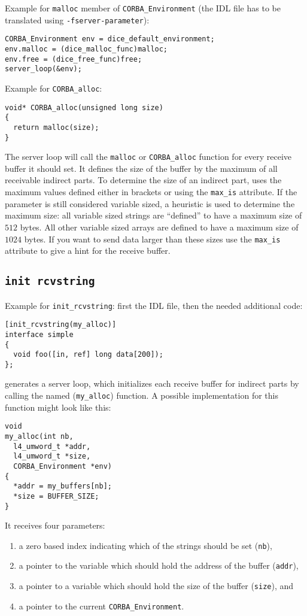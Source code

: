 Example for \verb|malloc| member of \verb|CORBA_Environment| (the
IDL file has to be translated using \verb|-fserver-parameter|):
\begin{verbatim}
CORBA_Environment env = dice_default_environment;
env.malloc = (dice_malloc_func)malloc;
env.free = (dice_free_func)free;
server_loop(&env);
\end{verbatim}

Example for \verb|CORBA_alloc|:
\begin{verbatim}
void* CORBA_alloc(unsigned long size)
{
  return malloc(size);
}
\end{verbatim}

The server loop will call the \verb|malloc| or \verb|CORBA_alloc|
function for every receive buffer it should set. It defines the
size of the buffer by the maximum of all receivable indirect parts.
To determine the size of an indirect part, \dice{} uses the
maximum values defined either in brackets or using the \verb|max_is|
attribute. If the parameter is still considered variable sized, a
heuristic is used to determine the maximum size: all variable sized
strings are ``defined'' to have a maximum size of $512$ bytes. All
other variable sized arrays are defined to have a maximum size of
$1024$ bytes. If you want to send data larger than these sizes use
the \verb|max_is| attribute to give \dice{} a hint for the receive
buffer.

\subsection{\tt init rcvstring}
Example for \verb|init_rcvstring|: first the IDL file, then the 
needed additional code:
\begin{verbatim}
[init_rcvstring(my_alloc)]
interface simple
{
  void foo([in, ref] long data[200]);
};
\end{verbatim}

\dice{} generates a server loop, which initializes each receive
buffer for indirect parts by calling the named (\verb|my_alloc|)
function. A possible implementation for this function might look
like this:

\begin{verbatim}
void
my_alloc(int nb, 
  l4_umword_t *addr, 
  l4_umword_t *size, 
  CORBA_Environment *env)
{
  *addr = my_buffers[nb];
  *size = BUFFER_SIZE;
}
\end{verbatim}

It receives four parameters: 
\begin{enumerate}
\item a zero based index indicating which of the strings should 
be set (\verb|nb|),
\item a pointer to the variable which should hold the address of the
buffer (\verb|addr|),
\item a pointer to a variable which should hold the size of the
buffer (\verb|size|), and
\item a pointer to the current \verb|CORBA_Environment|.
\end{enumerate}


